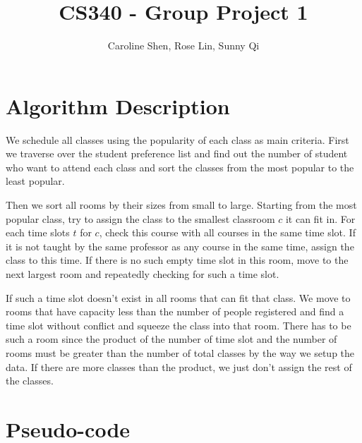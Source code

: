 \documentclass[11pt, oneside]{article}   	%
\title{CS340 - Group Project 1}
\author{Caroline Shen, Rose Lin, Sunny Qi}
\date{}							%
\begin{document}
\maketitle


\section{Algorithm Description}
We schedule all classes using the popularity of each class as main criteria. First we traverse over the student preference list and find out the number of student who want to attend each class and sort the classes from the most popular to the least popular. 

Then we sort all rooms by their sizes from small to large. Starting from the most popular class, try to assign the class to the smallest classroom $c$ it can fit in. For each time slots $t$ for $c$, check this course with all courses in the same time slot. If it is not taught by the same professor as any course in the same time, assign the class to this time. If there is no such empty time slot in this room, move to the next largest room and repeatedly checking for such a time slot. 

If such a time slot doesn't exist in all rooms that can fit that class. We move to rooms that have capacity less than the number of people registered and find a time slot without conflict and squeeze the class into that room. There has to be such a room since the product of the number of time slot and the number of rooms must be greater than the number of total classes by the way we setup the data. If there are more classes than the product, we just don't assign the rest of the classes.

\section{Pseudo-code}
\begin{algorithm}[H]
\end{algorithm}
\end{document}
